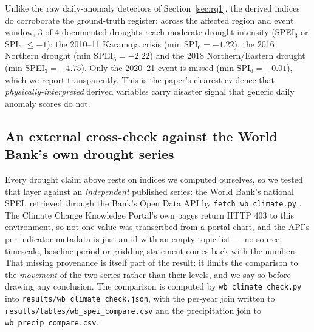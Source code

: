 \documentclass[preprint,12pt]{elsarticle}
\begin{document}
Unlike the raw daily-anomaly detectors of
Section~\ref{sec:rq1}, the derived indices do corroborate the
ground-truth register: across the affected region and event window, 3 of 4
documented droughts reach moderate-drought intensity (SPEI$_3$ or SPI$_6$
$\leq-1$): the 2010--11 Karamoja crisis (min SPI$_6=-1.22$), the 2016 Northern
drought (min SPEI$_6=-2.22$) and the 2018 Northern/Eastern drought (min
SPEI$_3=-4.75$). Only the 2020--21 event is missed (min SPI$_6=-0.01$), which
we report transparently. This is the paper's clearest evidence that
\emph{physically-interpreted} derived variables carry disaster signal that
generic daily anomaly scores do not.

\subsection{An external cross-check against the World Bank's own drought series}
\label{sec:wbcheck}
Every drought claim above rests on indices we computed ourselves, so we tested
that layer against an \emph{independent} published series: the World Bank's
national SPEI, retrieved through the Bank's Open Data API by
\texttt{fetch\_wb\_climate.py} \cite{worldbankclimate2026}. The Climate Change
Knowledge Portal's own pages return HTTP 403 to this environment, so not one value
was transcribed from a portal chart, and the API's per-indicator metadata is just
an id with an empty topic list --- no source, timescale, baseline period or
gridding statement comes back with the numbers. That missing provenance is itself
part of the result: it limits the comparison to the \emph{movement} of the two
series rather than their levels, and we say so before drawing any conclusion.
The comparison is computed by \texttt{wb\_climate\_check.py} into
\texttt{results/wb\_climate\_check.json}, with the per-year join written to
\texttt{results/tables/wb\_spei\_compare.csv} and the precipitation join to
\texttt{wb\_precip\_compare.csv}.
\end{document}
